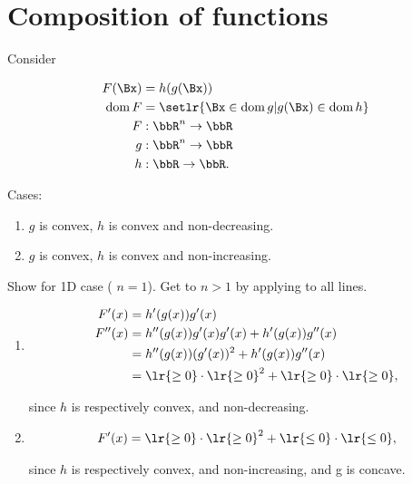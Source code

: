 \section{Composition of functions}

Consider

\begin{dmath}\label{eqn:convexOptimizationLecture8:160}
\begin{aligned}
F(\Bx) &= h(g(\Bx)) \\
\dom F &= \setlr{ \Bx \in \dom g | g(\Bx) \in \dom h } \\
F &: \bbR^n \rightarrow \bbR \\
g &: \bbR^n \rightarrow \bbR \\
h &: \bbR \rightarrow \bbR.
\end{aligned}
\end{dmath}

Cases:
\begin{enumerate}
\item \( g \) is convex, \( h \) is convex and non-decreasing.
\item \( g \) is convex, \( h \) is convex and non-increasing.
\end{enumerate}

Show for 1D case ( \( n = 1 \)).  Get to \( n > 1 \) by applying to all lines.

\begin{enumerate}
\item
\begin{dmath}\label{eqn:convexOptimizationLecture8:180}
\begin{aligned}
F'(x) &= h'(g(x)) g'(x) \\
F''(x) &=
h''(g(x)) g'(x) g'(x)
+
h'(g(x)) g''(x) \\
&=
h''(g(x)) (g'(x))^2
+
h'(g(x)) g''(x) \\
&= 
\lr{ \ge 0 } \cdot \lr{ \ge 0 }^2 + \lr{ \ge 0 } \cdot \lr{ \ge 0 },
\end{aligned}
\end{dmath}

since \( h \) is respectively convex, and non-decreasing.
\item

\begin{dmath}\label{eqn:convexOptimizationLecture8:180b}
\begin{aligned}
F'(x) = 
\lr{ \ge 0 } \cdot \lr{ \ge 0 }^2 + \lr{ \le 0 } \cdot \lr{ \le 0 },
\end{aligned}
\end{dmath}

since \( h \) is respectively convex, and non-increasing, and g is concave.
\end{enumerate}

